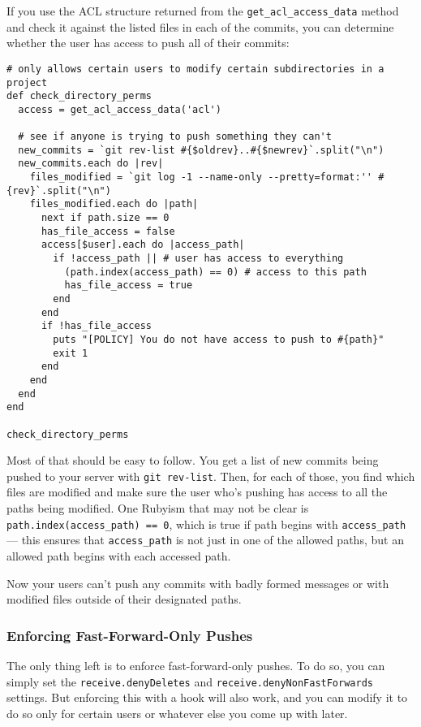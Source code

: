 \documentclass[a4paper]{book}
\begin{document}
If you use the ACL structure returned from the \texttt{get\_acl\_access\_data} method and check it against the listed files in each of the commits, you can determine whether the user has access to push all of their commits:

\begin{shaded}\begin{verbatim}
# only allows certain users to modify certain subdirectories in a project
def check_directory_perms
  access = get_acl_access_data('acl')

  # see if anyone is trying to push something they can't
  new_commits = `git rev-list #{$oldrev}..#{$newrev}`.split("\n")
  new_commits.each do |rev|
    files_modified = `git log -1 --name-only --pretty=format:'' #{rev}`.split("\n")
    files_modified.each do |path|
      next if path.size == 0
      has_file_access = false
      access[$user].each do |access_path|
        if !access_path || # user has access to everything
          (path.index(access_path) == 0) # access to this path
          has_file_access = true
        end
      end
      if !has_file_access
        puts "[POLICY] You do not have access to push to #{path}"
        exit 1
      end
    end
  end
end

check_directory_perms
\end{verbatim}\end{shaded}

Most of that should be easy to follow. You get a list of new commits being pushed to your server with \texttt{git rev-list}. Then, for each of those, you find which files are modified and make sure the user who's pushing has access to all the paths being modified. One Rubyism that may not be clear is \texttt{path.index(access\_path) == 0}, which is true if path begins with \texttt{access\_path} --- this ensures that \texttt{access\_path} is not just in one of the allowed paths, but an allowed path begins with each accessed path.

Now your users can't push any commits with badly formed messages or with modified files outside of their designated paths.

\subsubsection{Enforcing Fast-Forward-Only Pushes}

The only thing left is to enforce fast-forward-only pushes. To do so, you can simply set the \texttt{receive.denyDeletes} and \texttt{receive.denyNonFastForwards} settings. But enforcing this with a hook will also work, and you can modify it to do so only for certain users or whatever else you come up with later.
\end{document}
